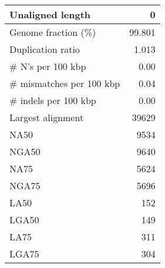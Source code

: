 \documentclass[12pt,a4paper]{article}
\begin{document}
\begin{table}[ht]
\begin{center}
\begin{tabular}{|l*{1}{|r}|}
Unaligned length & 0 \\ \hline
Genome fraction (\%) & 99.801 \\ \hline
Duplication ratio & 1.013 \\ \hline
\# N's per 100 kbp & 0.00 \\ \hline
\# mismatches per 100 kbp & 0.04 \\ \hline
\# indels per 100 kbp & 0.00 \\ \hline
Largest alignment & 39629 \\ \hline
NA50 & 9534 \\ \hline
NGA50 & 9640 \\ \hline
NA75 & 5624 \\ \hline
NGA75 & 5696 \\ \hline
LA50 & 152 \\ \hline
LGA50 & 149 \\ \hline
LA75 & 311 \\ \hline
LGA75 & 304 \\ \hline
\end{tabular}
\end{center}
\end{table}
\end{document}
